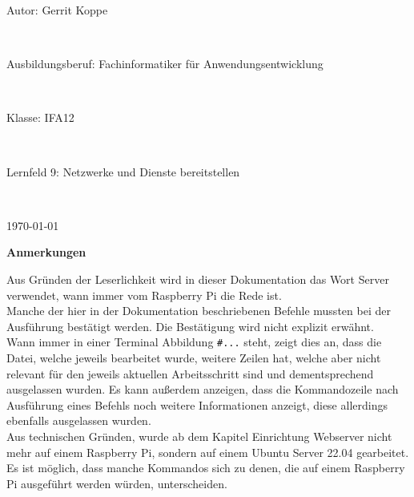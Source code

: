 \documentclass[a4paper, 11pt]{scrartcl}
\begin{document}
\begin{center}
    \vspace{0.1\textheight}
    \begin{Large}
        Autor: Gerrit Koppe
    \end{Large}
    \\
    \vspace{0.5cm}
    \begin{Large}
        Ausbildungsberuf: Fachinformatiker für Anwendungsentwicklung
    \end{Large}
    \\
    \vspace{0.5cm}
    \begin{Large}
        Klasse: IFA12
    \end{Large}
    \\
    \vspace{0.5cm}
    \begin{Large}
        Lernfeld 9: Netzwerke und Dienste bereitstellen
    \end{Large}
    \\
    \vspace{0.5cm}
    \begin{Large}
        \today
    \end{Large}
\end{center}
\newpage
\thispagestyle{empty}
\begin{Large}
    \begin{flushleft}
        \textbf{\textcolor{BBS}{Anmerkungen}}
    \end{flushleft}
\end{Large}
Aus Gründen der Leserlichkeit wird in dieser Dokumentation das Wort \glqq Server\grqq{} verwendet, wann immer vom Raspberry Pi die Rede ist.
\\
Manche der hier in der Dokumentation beschriebenen Befehle mussten bei der Ausführung bestätigt werden. Die Bestätigung wird nicht explizit
erwähnt.
\\
Wann immer in einer Terminal Abbildung \glqq\lstinline[basicstyle={\small\ttfamily\color{black}}]|#...|\grqq{} steht, zeigt dies an, dass die Datei, welche jeweils bearbeitet wurde,
weitere Zeilen hat, welche aber nicht relevant für den jeweils aktuellen Arbeitsschritt sind und dementsprechend ausgelassen wurden. Es kann außerdem anzeigen, dass
die Kommandozeile nach Ausführung eines Befehls noch weitere Informationen anzeigt, diese allerdings ebenfalls ausgelassen wurden.
\\
Aus technischen Gründen, wurde ab dem Kapitel \glqq Einrichtung Webserver\grqq{} nicht mehr auf einem Raspberry Pi, sondern auf einem Ubuntu Server 22.04 gearbeitet. Es ist möglich,
dass manche Kommandos sich zu denen, die auf einem Raspberry Pi ausgeführt werden würden, unterscheiden.
\end{document}
